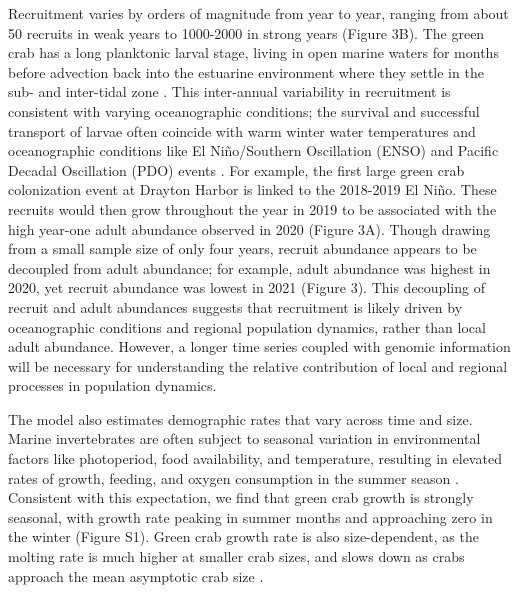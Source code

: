 \documentclass{article}
\begin{document}
Recruitment varies by orders of magnitude from year to year, ranging from about 50 recruits in weak years to 1000-2000 in strong years (Figure 3B). The green crab has a long planktonic larval stage, living in open marine waters for months before advection back into the estuarine environment where they settle in the sub- and inter-tidal zone \parencite{yamada2001global}. This inter-annual variability in recruitment is consistent with varying oceanographic conditions; the survival and successful transport of larvae often coincide with warm winter water temperatures and oceanographic conditions like El Niño/Southern Oscillation (ENSO) and Pacific Decadal Oscillation (PDO) events \parencite{yamada2021ocean}. For example, the first large green crab colonization event at Drayton Harbor is linked to the 2018-2019 El Niño. These recruits would then grow throughout the year in 2019 to be associated with the high year-one adult abundance observed in 2020 (Figure 3A). Though drawing from a small sample size of only four years, recruit abundance appears to be decoupled from adult abundance; for example, adult abundance was highest in 2020, yet recruit abundance was lowest in 2021 (Figure 3). This decoupling of recruit and adult abundances suggests that recruitment is likely driven by oceanographic conditions and regional population dynamics, rather than local adult abundance. However, a longer time series coupled with genomic information will be necessary for understanding the relative contribution of local and regional processes in population dynamics.

The model also estimates demographic rates that vary across time and size. Marine invertebrates are often subject to seasonal variation in environmental factors like photoperiod, food availability, and temperature, resulting in elevated rates of growth, feeding, and oxygen consumption in the summer season \parencite{brockington2001relative}. Consistent with this expectation, we find that green crab growth is strongly seasonal, with growth rate peaking in summer months and approaching zero in the winter (Figure S1). Green crab growth rate is also size-dependent, as the molting rate is much higher at smaller crab sizes, and slows down as crabs approach the mean asymptotic crab size \parencite{yamada2005growth}.
\end{document}
